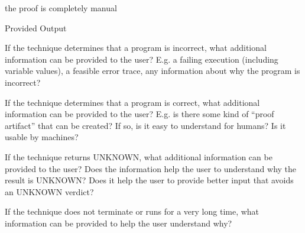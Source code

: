 \documentclass[a4paper]{article}
\begin{document}
\begin{minipage}[t]{0.16\linewidth}
\begin{betterlist}
\begin{betterlist}
			\item \checkboxUnchecked the proof is completely manual
		\end{betterlist}
		\item \alert{Provided Output}
		\begin{betterlist}
			\item If the technique determines that a program is incorrect, what additional information can be provided to the user? E.g. a failing execution (including variable values), a feasible error trace, any information about why the program is incorrect?

			\item If the technique determines that a program is correct, what additional information can be provided to the user? E.g. is there some kind of \enquote{proof artifact} that can be created? If so, is it easy to understand for humans? Is it usable by machines?

			\item If the technique returns UNKNOWN, what additional information can be provided to the user? Does the information help the user to understand why the result is UNKNOWN? Does it help the user to provide better input that avoids an UNKNOWN verdict?

			\item If the technique does not terminate or runs for a very long time, what information can be provided to help the user understand why?


\end{betterlist}
\end{betterlist}
\end{minipage}
\end{document}
